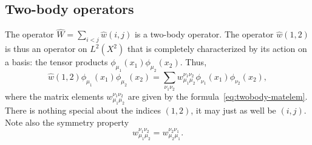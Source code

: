 \documentclass{report}
\theoremstyle{plain}
\theoremstyle{definition}
\begin{document}
\subsection{Two-body operators}

The operator $\hat{W} = \sum_{i<j} \hat{w}(i,j)$ is a two-body
operator. The operator $\hat{w}(1,2)$ is thus an operator on
$L^2(X^2)$ that is completely characterized by its action on a basis:
the tensor products $\phi_{\mu_1}(x_1)\phi_{\mu_2}(x_2)$. Thus,
\begin{equation}
  \hat{w}(1,2)\phi_{\mu_1}(x_1)\phi_{\mu_2}(x_2) = \sum_{\nu_1\nu_2}
  w^{\nu_1\nu_2}_{\mu_1\mu_2} \phi_{\nu_1}(x_1) \phi_{\nu_2}(x_2),\label{eq:0}
\end{equation}
where the matrix elements $w^{\nu_1\nu_2}_{\mu_1\mu_2}$ are given by
the formula~\eqref{eq:twobody-matelem}. There is nothing special about
the indices $(1,2)$, it may just as well be $(i,j)$. Note also the
symmetry property
\[ w^{\nu_1\nu_2}_{\mu_1\mu_2} = w^{\nu_2\nu_1}_{\mu_2\mu_1} .\]
\end{document}
